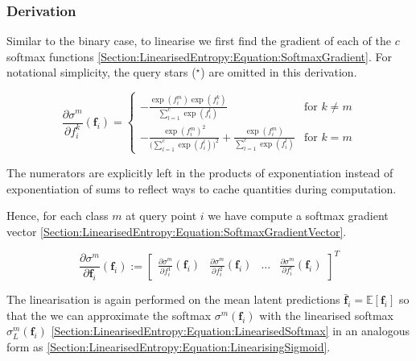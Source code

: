 \documentclass{article}
\renewcommand{\vec}[1]{\boldsymbol{#1}}
\begin{document}
		\subsubsection{Derivation}
		
			Similar to the binary case, to linearise we first find the gradient of each of the $c$ softmax functions \eqref{Section:LinearisedEntropy:Equation:SoftmaxGradient}. For notational simplicity, the query stars ($^{\star}$) are omitted in this derivation.
			
			\begin{equation}
				\frac{\partial \sigma^{m}}{\partial f^{k}_{i}}(\vec{f}_{i}) =
				\begin{cases} 
					- \frac{\exp(f^{m}_{i}) \exp(f^{k}_{i})}{\sum_{l = 1}^{c} \exp(f^{l}_{i})} & \text{for } k \neq m  \\
					- \frac{\exp(f^{m}_{i})^{2}}{\big(\sum_{l = 1}^{c} \exp(f^{l}_{i})\big)^{2}} + \frac{\exp(f^{m}_{i})}{\sum_{l = 1}^{c} \exp(f^{l}_{i})}& \text{for } k = m
				\end{cases}
			\label{Section:LinearisedEntropy:Equation:SoftmaxGradient}
			\end{equation}			
		
			The numerators are explicitly left in the products of exponentiation instead of exponentiation of sums to reflect ways to cache quantities during computation. 
			
			Hence, for each class $m$ at query point $i$ we have compute a softmax gradient vector \eqref{Section:LinearisedEntropy:Equation:SoftmaxGradientVector}.
			
			\begin{equation}
				\frac{\partial \sigma^{m}}{\partial \vec{f}_{i}}(\vec{f}_{i}) := \begin{bmatrix} \frac{\partial \sigma^{m}}{\partial f^{1}_{i}}(\vec{f}_{i}) & \frac{\partial \sigma^{m}}{\partial f^{2}_{i}}(\vec{f}_{i}) & \dots & \frac{\partial \sigma^{m}}{\partial f^{c}_{i}}(\vec{f}_{i}) \end{bmatrix}^{T}
			\label{Section:LinearisedEntropy:Equation:SoftmaxGradientVector}
			\end{equation}
			
			The linearisation is again performed on the mean latent predictions $\bar{\vec{f}}_{i} = \mathbb{E}[\vec{f}_{i}]$ so that the we can approximate the softmax $\sigma^{m}(\vec{f}_{i})$ with the linearised softmax $\sigma^{m}_{L}(\vec{f}_{i})$ \eqref{Section:LinearisedEntropy:Equation:LinearisedSoftmax} in an analogous form as \eqref{Section:LinearisedEntropy:Equation:LinearisingSigmoid}.
			
\end{document}
